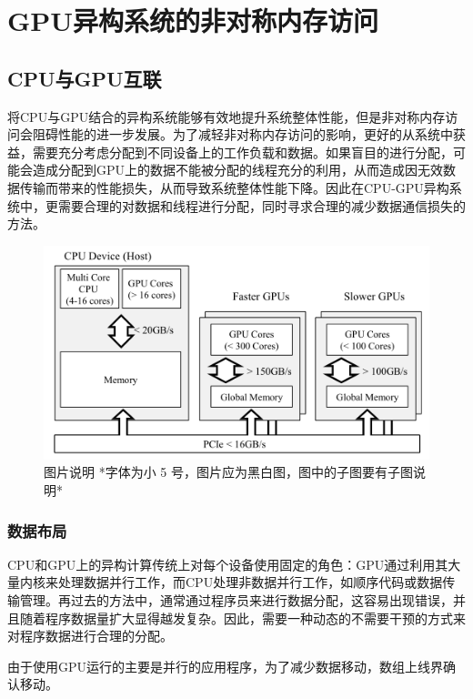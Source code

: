\documentclass{cjc}
\begin{document}
\section{GPU异构系统的非对称内存访问}

\subsection{CPU与GPU互联}

将CPU与GPU结合的异构系统能够有效地提升系统整体性能，但是非对称内存访问会阻碍性能的进一步发展。为了减轻非对称内存访问的影响，更好的从系统中获益，需要充分考虑分配到不同设备上的工作负载和数据。如果盲目的进行分配，可能会造成分配到GPU上的数据不能被分配的线程充分的利用，从而造成因无效数据传输而带来的性能损失，从而导致系统整体性能下降。因此在CPU-GPU异构系统中，更需要合理的对数据和线程进行分配，同时寻求合理的减少数据通信损失的方法。

\begin{figure}[htb]
  \centering
  \includegraphics[width=\linewidth]{1.png}
  \caption{图片说明 *字体为小 5 号，图片应为黑白图，图中的子图要有子图说明*}
\end{figure}

\subsubsection{数据布局}

CPU和GPU上的异构计算传统上对每个设备使用固定的角色：GPU通过利用其大量内核来处理数据并行工作，而CPU处理非数据并行工作，如顺序代码或数据传输管理。再过去的方法中，通常通过程序员来进行数据分配，这容易出现错误，并且随着程序数据量扩大显得越发复杂。因此，需要一种动态的不需要干预的方式来对程序数据进行合理的分配。

由于使用GPU运行的主要是并行的应用程序，为了减少数据移动，数组上线界确认移动。
\end{document}
